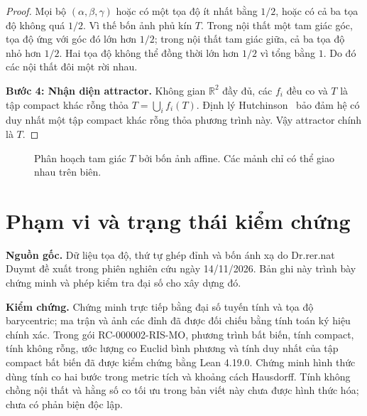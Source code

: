 \documentclass[12pt,a4paper]{article}
\begin{document}
\begin{proof}
Mọi bộ $(\alpha,\beta,\gamma)$ hoặc có một tọa độ ít nhất bằng $1/2$, hoặc có cả ba tọa độ không quá $1/2$. Vì thế bốn ảnh phủ kín $T$. Trong nội thất một tam giác góc, tọa độ ứng với góc đó lớn hơn $1/2$; trong nội thất tam giác giữa, cả ba tọa độ nhỏ hơn $1/2$. Hai tọa độ không thể đồng thời lớn hơn $1/2$ vì tổng bằng $1$. Do đó các nội thất đôi một rời nhau.

\textbf{Bước 4: Nhận diện attractor.}
Không gian $\mathbb R^2$ đầy đủ, các $f_i$ đều co và $T$ là tập compact khác rỗng thỏa $T=\bigcup_i f_i(T)$. Định lý Hutchinson~\cite[\S 3.1]{hutchinson1981} bảo đảm hệ có duy nhất một tập compact khác rỗng thỏa phương trình này. Vậy attractor chính là $T$.
\end{proof}

\begin{figure}[htbp]
\centering
{}
\caption{Phân hoạch tam giác $T$ bởi bốn ảnh affine. Các mảnh chỉ có thể giao nhau trên biên.}
\end{figure}

\section{Phạm vi và trạng thái kiểm chứng}
\textbf{Nguồn gốc.} Dữ liệu tọa độ, thứ tự ghép đỉnh và bốn ánh xạ do Dr.rer.nat Duymt đề xuất trong phiên nghiên cứu ngày 14/11/2026. Bản ghi này trình bày chứng minh và phép kiểm tra đại số cho xây dựng đó.

\textbf{Kiểm chứng.} Chứng minh trực tiếp bằng đại số tuyến tính và tọa độ barycentric; ma trận và ảnh các đỉnh đã được đối chiếu bằng tính toán ký hiệu chính xác. Trong gói RC-000002-RIS-MO, phương trình bất biến, tính compact, tính không rỗng, ước lượng co Euclid bình phương và tính duy nhất của tập compact bất biến đã được kiểm chứng bằng Lean 4.19.0. Chứng minh hình thức dùng tính co hai bước trong metric tích và khoảng cách Hausdorff. Tính không chồng nội thất và hằng số co tối ưu trong bản viết này chưa được hình thức hóa; chưa có phản biện độc lập.
\end{document}
